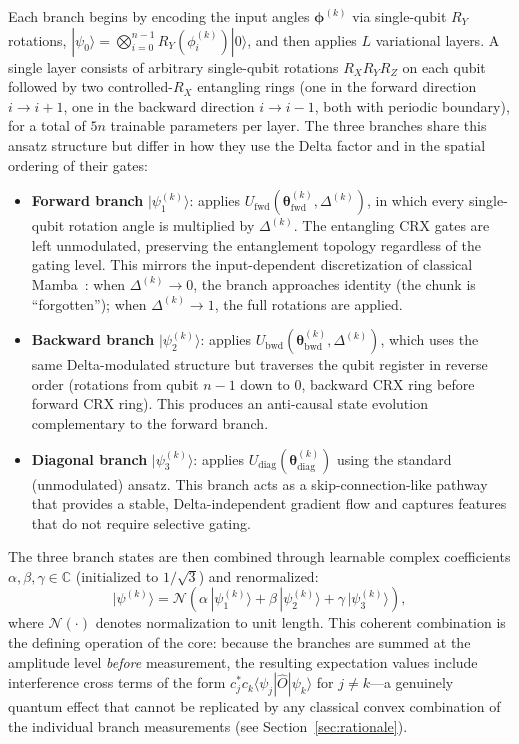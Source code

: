 Each branch begins by encoding the input angles $\boldsymbol{\phi}^{(k)}$ via single-qubit $R_Y$ rotations, $|\psi_0\rangle = \bigotimes_{i=0}^{n-1} R_Y(\phi_i^{(k)})|0\rangle$, and then applies $L$ variational layers.
A single layer consists of arbitrary single-qubit rotations $R_X R_Y R_Z$ on each qubit followed by two controlled-$R_X$ entangling rings (one in the forward direction $i \to i{+}1$, one in the backward direction $i \to i{-}1$, both with periodic boundary), for a total of $5n$ trainable parameters per layer.
The three branches share this ansatz structure but differ in how they use the Delta factor and in the spatial ordering of their gates:
\begin{itemize}
    \item \textbf{Forward branch} $|\psi_1^{(k)}\rangle$: applies $U_{\text{fwd}}(\boldsymbol{\theta}_{\text{fwd}}^{(k)}, \Delta^{(k)})$, in which every single-qubit rotation angle is multiplied by $\Delta^{(k)}$. The entangling CRX gates are left unmodulated, preserving the entanglement topology regardless of the gating level. This mirrors the input-dependent discretization of classical Mamba~\cite{gu2023mamba}: when $\Delta^{(k)} \to 0$, the branch approaches identity (the chunk is ``forgotten''); when $\Delta^{(k)} \to 1$, the full rotations are applied.
    \item \textbf{Backward branch} $|\psi_2^{(k)}\rangle$: applies $U_{\text{bwd}}(\boldsymbol{\theta}_{\text{bwd}}^{(k)}, \Delta^{(k)})$, which uses the same Delta-modulated structure but traverses the qubit register in reverse order (rotations from qubit $n{-}1$ down to $0$, backward CRX ring before forward CRX ring). This produces an anti-causal state evolution complementary to the forward branch.
    \item \textbf{Diagonal branch} $|\psi_3^{(k)}\rangle$: applies $U_{\text{diag}}(\boldsymbol{\theta}_{\text{diag}}^{(k)})$ using the standard (unmodulated) ansatz. This branch acts as a skip-connection-like pathway that provides a stable, Delta-independent gradient flow and captures features that do not require selective gating.
\end{itemize}

The three branch states are then combined through learnable complex coefficients $\alpha, \beta, \gamma \in \mathbb{C}$ (initialized to $1/\sqrt{3}$) and renormalized:
\begin{equation}
    |\psi^{(k)}\rangle = \mathcal{N}\!\left(\alpha\,|\psi_1^{(k)}\rangle + \beta\,|\psi_2^{(k)}\rangle + \gamma\,|\psi_3^{(k)}\rangle\right),
    \label{eq:superposition}
\end{equation}
where $\mathcal{N}(\cdot)$ denotes normalization to unit length.
This coherent combination is the defining operation of the core: because the branches are summed at the amplitude level \emph{before} measurement, the resulting expectation values include interference cross terms of the form $c_j^{*} c_k \langle\psi_j|\hat{O}|\psi_k\rangle$ for $j \neq k$---a genuinely quantum effect that cannot be replicated by any classical convex combination of the individual branch measurements (see Section~\ref{sec:rationale}).

